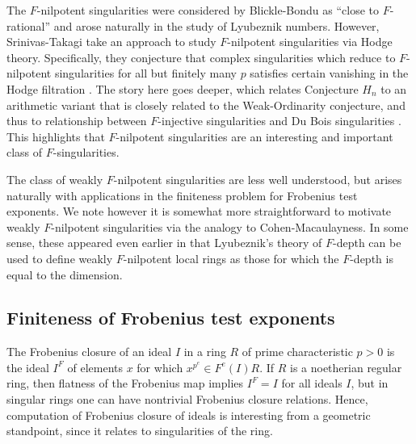 \documentclass{amsproc}
\theoremstyle{definition}
\theoremstyle{remark}
\numberwithin{equation}{section}
\begin{document}
\begin{center}
\end{center}


The $F$-nilpotent singularities were considered by Blickle-Bondu \cite{BB05} as ``close to $F$-rational'' and arose naturally in the study of Lyubeznik numbers. However, Srinivas-Takagi take an approach to study $F$-nilpotent singularities via Hodge theory. Specifically, they conjecture that complex singularities which reduce to $F$-nilpotent singularities for all but finitely many $p$ satisfies certain vanishing in the Hodge filtration \cite[Conj. $H_n$]{ST17}. The story here goes deeper, which relates Conjecture $H_n$ to an arithmetic variant \cite[Conj. $N_n$]{ST17} that is closely related to the Weak-Ordinarity conjecture, and thus to relationship between $F$-injective singularities and Du Bois singularities \cite{BST17}. This highlights that $F$-nilpotent singularities are an interesting and important class of $F$-singularities. 


The class of weakly $F$-nilpotent singularities are less well understood, but arises naturally with applications in the finiteness problem for Frobenius test exponents. We note however it is somewhat more straightforward to motivate weakly $F$-nilpotent singularities via the analogy to Cohen-Macaulayness. In some sense, these appeared even earlier in that Lyubeznik's theory of $F$-depth can be used to define weakly $F$-nilpotent local rings as those for which the $F$-depth is equal to the dimension.  


\subsection{Finiteness of Frobenius test exponents} 

The Frobenius closure of an ideal $I$ in a ring $R$ of prime characteristic $p>0$ is the ideal $I^F$ of elements $x$ for which $x^{p^e} \in F^e(I)R$. If $R$ is a noetherian regular ring, then flatness of the Frobenius map implies $I^F=I$ for all ideals $I$, but in singular rings one can have nontrivial Frobenius closure relations. Hence, computation of Frobenius closure of ideals is interesting from a geometric standpoint, since it relates to singularities of the ring.
\end{document}
